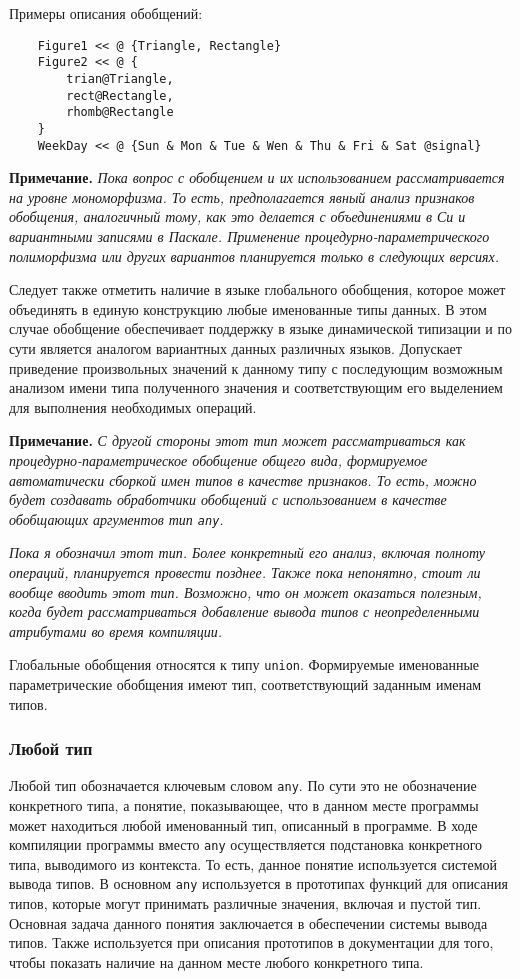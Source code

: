 {Примеры описания обобщений:

\begin{verbatim}
    Figure1 << @ {Triangle, Rectangle}
    Figure2 << @ {
        trian@Triangle,
        rect@Rectangle,
        rhomb@Rectangle
    }
    WeekDay << @ {Sun & Mon & Tue & Wen & Thu & Fri & Sat @signal}
\end{verbatim}

\textbf{Примечание.}
\textit{Пока вопрос с обобщением и их использованием рассматривается на уровне мономорфизма. То есть, предполагается явный анализ признаков обобщения, аналогичный тому, как это делается с объединениями в Си и вариантными записями в Паскале. Применение процедурно-параметрического полиморфизма или других вариантов планируется только в следующих версиях.}

Следует также отметить наличие в языке глобального обобщения, которое может объединять в единую конструкцию любые именованные типы данных. В этом случае обобщение обеспечивает поддержку в языке динамической типизации и по сути является аналогом вариантных данных различных языков. Допускает приведение произвольных значений к данному типу с последующим возможным анализом имени типа полученного значения и соответствующим его выделением для выполнения необходимых операций.

\textbf{Примечание.}
\textit{С другой стороны этот тип может рассматриваться как процедурно-параметрическое обобщение общего вида, формируемое автоматически сборкой имен типов в качестве признаков. То есть, можно будет создавать обработчики обобщений с использованием в качестве обобщающих аргументов тип \texttt{any}.}

\textit{Пока я обозначил этот тип. Более конкретный его анализ, включая полноту операций, планируется провести позднее. Также пока непонятно, стоит ли вообще вводить этот тип. Возможно, что он может оказаться полезным, когда будет рассматриваться добавление вывода типов с неопределенными атрибутами во время компиляции.}

Глобальные обобщения относятся к типу \texttt{union}. Формируемые именованные параметрические обобщения имеют тип, соответствующий заданным именам типов.

\subsubsection{Любой тип}

Любой тип обозначается ключевым словом \texttt{any}. По сути это не обозначение конкретного типа, а понятие, показывающее, что в данном месте программы может находиться любой именованный тип, описанный в программе. В ходе компиляции программы вместо \texttt{any} осуществляется подстановка конкретного типа, выводимого из контекста. То есть, данное понятие используется системой вывода типов. В основном \texttt{any} используется в прототипах функций для описания типов, которые могут принимать различные значения, включая и пустой тип. Основная задача данного понятия заключается в обеспечении системы вывода типов. Также используется при описания прототипов в документации для того, чтобы показать наличие на данном месте любого конкретного типа.

}
